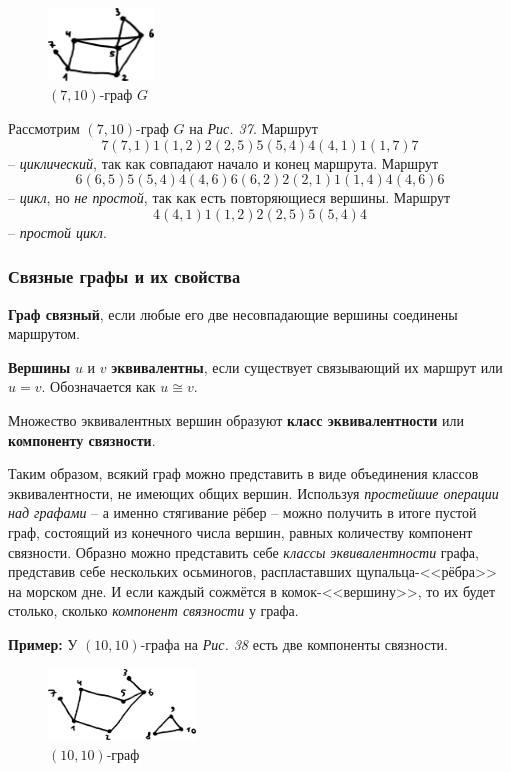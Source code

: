\documentclass[12pt, a4paper]{article}
\begin{document}
\begin{figure}
 \centering
 \includegraphics[width=0.25\textwidth]{38}
 \vspace{-4mm}
 \caption{$(7,10)$-граф $G$}
\end{figure}

Рассмотрим $(7,10)$-граф $G$ на \textit{Рис. 37}. Маршрут
\[7(7,1)1(1,2)2(2,5)5(5,4)4(4,1)1(1,7)7 \]
-- \textit{циклический}, так как совпадают начало и конец маршрута. Маршрут
\[6(6,5)5(5,4)4(4,6)6(6,2)2(2,1)1(1,4)4(4,6)6 \]
-- \textit{цикл}, но \textit{не простой}, так как есть повторяющиеся вершины. Маршрут
\[4(4,1)1(1,2)2(2,5)5(5,4)4 \]
-- \textit{простой цикл}.

\subsubsection{Связные графы и их свойства}

\textbf{Граф связный}, если любые его две несовпадающие вершины соединены маршрутом.

\textbf{Вершины} $u$ и $v$ \textbf{эквивалентны}, если существует связывающий их маршрут или $u=v$. Обозначается как $u \cong v$.

Множество эквивалентных вершин образуют \textbf{класс эквивалентности} или \textbf{компоненту связности}.

Таким образом, всякий граф можно представить в виде объединения классов эквивалентности, не имеющих общих вершин. Используя \textit{простейшие операции над графами} -- а именно стягивание рёбер -- можно получить в итоге пустой граф, состоящий из конечного числа вершин, равных количеству компонент связности. Образно можно представить себе \textit{классы эквивалентности} графа, представив себе нескольких осьминогов, распластавших щупальца-<<рёбра>> на морском дне. И если каждый сожмётся в комок-<<вершину>>, то их будет столько, сколько \textit{компонент связности} у графа.

\textbf{Пример:} У $(10,10)$-графа на \textit{Рис. 38} есть две компоненты связности.

\begin{figure}[h]
 \centering
 \includegraphics[width=0.35\textwidth]{36}
 \vspace{-4mm}
 \caption{$(10,10)$-граф}
\end{figure}
\end{document}
